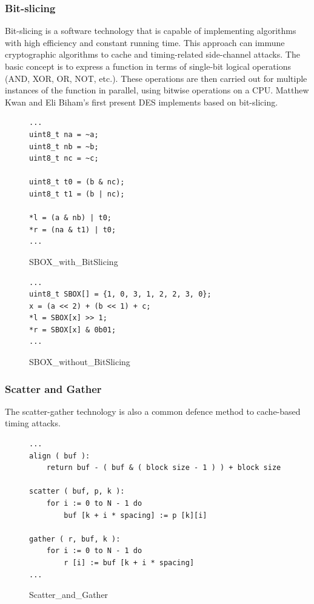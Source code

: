 \subsubsection{Bit-slicing}
Bit-slicing is a software technology that is capable of implementing algorithms with high efficiency and constant running time. 
This approach can immune cryptographic algorithms to cache and timing-related side-channel attacks. The basic concept is to express a function in terms of single-bit logical operations (AND, XOR, OR, NOT, etc.). These operations are then carried out for multiple instances of the function in parallel, using bitwise operations on a CPU. 
Matthew Kwan and Eli Biham's first present DES implements based on bit-slicing. 

\begin{figure}[h!]
    \centering
\begin{lstlisting}[xleftmargin=.02\textwidth,xrightmargin=.01\textwidth]
...
uint8_t na = ~a;
uint8_t nb = ~b;
uint8_t nc = ~c;

uint8_t t0 = (b & nc);
uint8_t t1 = (b | nc);

*l = (a & nb) | t0;
*r = (na & t1) | t0;
...
\end{lstlisting}
\caption{SBOX\_with\_BitSlicing}
\label{SBOX_bitslicing}
\end{figure}

\begin{figure}[h!]
    \centering
\begin{lstlisting}[xleftmargin=.02\textwidth,xrightmargin=.01\textwidth]
...
uint8_t SBOX[] = {1, 0, 3, 1, 2, 2, 3, 0};
x = (a << 2) + (b << 1) + c;
*l = SBOX[x] >> 1;
*r = SBOX[x] & 0b01;
...
\end{lstlisting}
\caption{SBOX\_without\_BitSlicing}
\label{SBOX_da}
\end{figure}

\subsubsection{Scatter and Gather}
The scatter-gather technology is also a common defence method to cache-based timing attacks.
\begin{figure}[h!]
    \centering
\begin{lstlisting}[xleftmargin=.02\textwidth,xrightmargin=.01\textwidth]
...
align ( buf ):
    return buf - ( buf & ( block size - 1 ) ) + block size

scatter ( buf, p, k ):
    for i := 0 to N - 1 do
        buf [k + i * spacing] := p [k][i]

gather ( r, buf, k ):
    for i := 0 to N - 1 do
        r [i] := buf [k + i * spacing]
...
\end{lstlisting}
\caption{Scatter\_and\_Gather}
\label{Scatter_and_Gather}
\end{figure}

